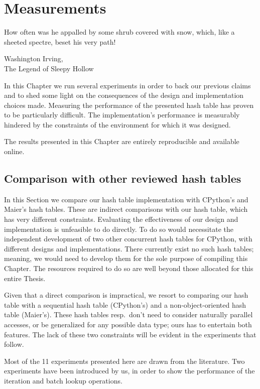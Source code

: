 \chapter{Measurements}\label{ch:measurements}

\epigraph{%
    How often was he appalled by some shrub covered with snow, which, like a sheeted spectre, beset his very path!
}{Washington Irving,\\The Legend of Sleepy Hollow}

In this Chapter we run several experiments in order to back our previous claims and to shed some light on the consequences of the design and implementation choices made.
Measuring the performance of the presented hash table has proven to be particularly difficult.
The implementation's performance is measurably hindered by the constraints of the environment for which it was designed.

The results presented in this Chapter are entirely reproducible and available online.


\section{Comparison with other reviewed hash tables}\label{sec:comparison-with-other-reviewed-hash-tables}

In this Section we compare our hash table implementation with CPython's and Maier's hash tables.
These are indirect comparisons with our hash table, which has very different constraints.
Evaluating the effectiveness of our design and implementation is unfeasible to do directly.
To do so would necessitate the independent development of two other concurrent hash tables for CPython, with different designs and implementations.
There currently exist no such hash tables; meaning, we would need to develop them for the sole purpose of compiling this Chapter.
The resources required to do so are well beyond those allocated for this entire Thesis.

Given that a direct comparison is impractical, we resort to comparing our hash table with a sequential hash table (CPython's) and a non-object-oriented hash table (Maier's).
These hash tables resp.\ don't need to consider naturally parallel accesses, or be generalized for any possible data type; ours has to entertain both features.
The lack of these two constraints will be evident in the experiments that follow.

Most of the 11 experiments presented here are drawn from the literature.
Two experiments have been introduced by us, in order to show the performance of the iteration and batch lookup operations.


